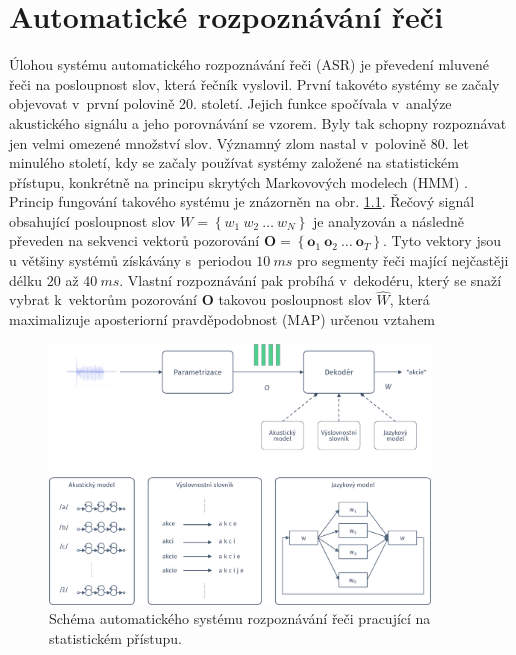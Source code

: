 \chapter{Automatické rozpoznávání řeči}
\label{chap:asr}

Úlohou systému automatického rozpoznávání řeči (ASR) je převedení mluvené řeči na posloupnost slov, která řečník vyslovil. První takovéto systémy se začaly objevovat v~první polovině 20. století. Jejich funkce spočívala v~analýze akustického signálu a jeho porovnávání se vzorem. Byly tak schopny rozpoznávat jen velmi omezené množství slov. Významný zlom nastal v~polovině 80. let minulého století, kdy se začaly používat systémy založené na statistickém přístupu, konkrétně na principu skrytých Markovových modelech (HMM) \cite{Holmes2001}. Princip fungování takového systému je znázorněn na obr. \ref{fig:asr:decoding}. Řečový signál obsahující posloupnost slov $W = \left\{ w_1\ w_2\ \dots\ w_N \right\}$ je analyzován a následně převeden na sekvenci vektorů pozorování $\boldsymbol{O} = \left\{\boldsymbol{o}_1\ \boldsymbol{o}_2\ \dots\ \boldsymbol{o}_T\right\}$. Tyto vektory jsou u většiny systémů získávány s~periodou $10\ ms$ pro segmenty řeči mající nejčastěji délku $20$ až $40\ ms$. Vlastní rozpoznávání pak probíhá v~dekodéru, který se snaží vybrat  k~vektorům pozorování $\boldsymbol{O}$ takovou posloupnost slov $\hat{W}$, která maximalizuje aposteriorní pravděpodobnost (MAP) určenou vztahem

\begin{figure}[hbpt]
  \centering
  \includegraphics[width=0.9\textwidth]{./ch4-asr/img/decoding.pdf}
  \caption[Schéma ASR systému pracující se statistickou.]{Schéma automatického systému rozpoznávání řeči pracující na statistickém přístupu.}
  \label{fig:asr:decoding}
\end{figure}

